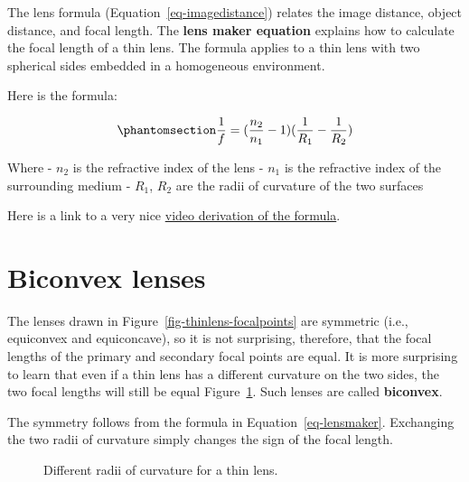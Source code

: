 \documentclass[
  letterpaper,
]{book}
\begin{document}
The lens formula (Equation~\ref{eq-imagedistance}) relates the image
distance, object distance, and focal length. The \textbf{lens maker
equation} explains how to calculate the focal length of a thin lens. The
formula applies to a thin lens with two spherical sides embedded in a
homogeneous environment.

Here is the formula:

\begin{equation}\phantomsection\label{eq-lensmaker}{
\frac{1}{f} = (\frac{n_2}{n_1} - 1) ( \frac{1}{R_1} - \frac{1}{R_2}) 
}\end{equation}

Where - \(n_2\) is the refractive index of the lens - \(n_1\) is the
refractive index of the surrounding medium - \(R_1\), \(R_2\) are the
radii of curvature of the two surfaces

Here is a link to a very nice
\href{https://www.khanacademy.org/science/in-in-class-12th-physics-india/in-in-ray-optics-and-optical-instruments/in-in-refraction-in-thin-lenses/v/lens-makers-formula}{video
derivation of the formula}.

\section{Biconvex lenses}\label{sec-optics-biconvex}

The lenses drawn in Figure~\ref{fig-thinlens-focalpoints} are symmetric
(i.e., equiconvex and equiconcave), so it is not surprising, therefore,
that the focal lengths of the primary and secondary focal points are
equal. It is more surprising to learn that even if a thin lens has a
different curvature on the two sides, the two focal lengths will still
be equal Figure~\ref{fig-thinlens-asymmetric}. Such lenses are called
\textbf{biconvex}.

The symmetry follows from the formula in Equation~\ref{eq-lensmaker}.
Exchanging the two radii of curvature simply changes the sign of the
focal length.

\begin{figure}


\caption{\label{fig-thinlens-asymmetric}Different radii of curvature for
a thin lens.}

\end{figure}%
\end{document}
